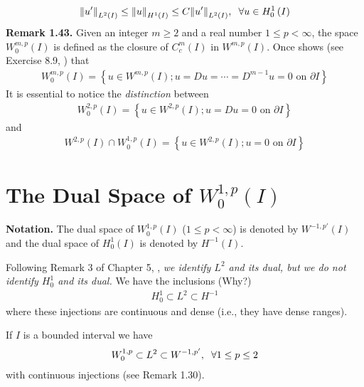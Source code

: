 \documentclass[a4paper,oneside]{book}
\numberwithin{equation}{chapter}
\begin{document}
\begin{align}
{\left\| {u'} \right\|_{{L^2}\left( I \right)}} \le {\left\| u \right\|_{{H^1}\left( I \right)}} \le C{\left\| {u'} \right\|_{{L^2}\left( I \right)}},\hspace{0.2cm}\forall u \in H_0^1\left( I \right)
\end{align}
\textbf{Remark 1.43.} Given an integer $m\ge 2$ and a real number $1\le p<\infty$, the space $W_0^{m,p}\left(I\right)$ is defined as the closure of $C_c^m\left(I\right)$ in $W^{m,p}\left(I\right)$. Once shows (see Exercise 8.9, \cite{1}) that
\begin{align}
W_0^{m,p}\left( I \right) = \left\{ {u \in {W^{m,p}}\left( I \right);u = Du =  \cdots  = {D^{m - 1}}u = 0\mbox{ on } \partial I} \right\}
\end{align}
It is essential to notice the \textit{distinction} between
\begin{align}
W_0^{2,p}\left( I \right) = \left\{ {u \in {W^{2,p}}\left( I \right);u = Du = 0\mbox{ on } \partial I} \right\}
\end{align}
and
\begin{align}
{W^{2,p}}\left( I \right) \cap W_0^{1,p}\left( I \right) = \left\{ {u \in {W^{2,p}}\left( I \right);u = 0\mbox{ on } \partial I} \right\}
\end{align}
\section*{The Dual Space of $W_0^{1,p}\left(I\right)$}
\textbf{Notation.} The dual space of $W_0^{1,p}\left(I\right)$ ($1\le p<\infty$) is denoted by ${W^{ - 1,p'}}\left( I \right)$ and the dual space of $H_0^1\left(I\right)$ is denoted by $H^{-1}\left(I\right)$. 

Following Remark 3 of Chapter 5, \cite{1}, \textit{we identify $L^2$ and its dual, but we do not identify $H_0^1$ and its dual.} We have the inclusions (Why?)
\begin{align}
H_0^1 \subset {L^2} \subset {H^{ - 1}}
\end{align}
where these injections are continuous and dense (i.e., they have dense ranges). 

If $I$ is a bounded interval we have
\begin{align}
W_0^{1,p} \subset {L^2} \subset {W^{ - 1,p'}},\hspace{0.2cm}\forall 1 \le p \le 2
\end{align}
with continuous injections (see Remark 1.30).
\end{document}

